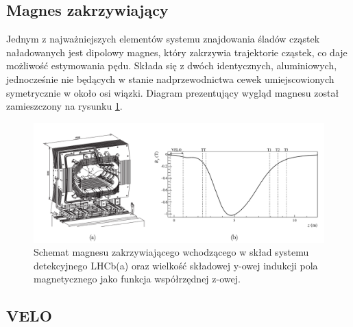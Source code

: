 \subsection{Magnes zakrzywiający}
Jednym z najważniejszych elementów systemu znajdowania śladów cząstek naładowanych jest dipolowy magnes, który zakrzywia trajektorie cząstek, co daje możliwość estymowania pędu. Składa się z dwóch identycznych, aluminiowych, jednocześnie nie będących w stanie nadprzewodnictwa cewek umiejscowionych symetrycznie w około osi wiązki. Diagram prezentujący wygląd magnesu został zamieszczony na rysunku \ref{fig:magnes}. 
\begin{figure}[!ht]
 \centering
 \includegraphics[scale=0.35]{rozdzial2/magnes.png}
 \caption{Schemat magnesu zakrzywiającego wchodzącego w skład systemu detekcyjnego LHCb(a) oraz wielkość składowej y-owej indukcji pola magnetycznego jako funkcja współrzędnej z-owej.  }
 \label{fig:magnes}
\end{figure}

 


\subsection{VELO}
\label{VELO}

